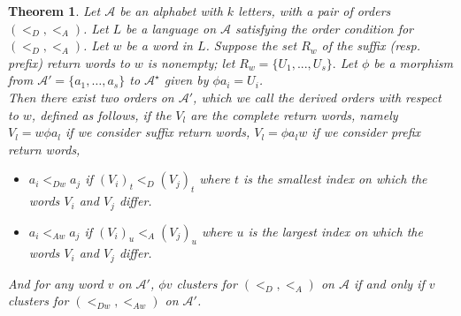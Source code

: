 \documentclass[12pt,a4paper]{amsart}
\newtheorem{theorem}{Theorem}
\begin{document}
\begin{theorem}\label{t2} Let  $\mathcal A$ be an alphabet with $k$ letters, with a pair of orders $(<_D,<_A)$. Let $L$ be a language on $\mathcal A$ satisfying the order condition for  $(<_D,<_A)$. Let $w$ be a word in $L$. Suppose the set $R_w$ of the suffix (resp. prefix) return words to  $w$  is nonempty; let
$R_w=\{U_1, ... , U_s\}.$ Let $\phi$ be  a morphism from $\mathcal A'=\{a_1, \ldots, a_s\}$ 
to $\mathcal A^{\star}$ given  by $\phi a_i=U_i$. \\
Then there exist two orders on  $\mathcal A'$, which we call the {\em derived orders with respect to $w$}, defined as follows, if the $V_l$ are the complete return words, namely $V_l=w\phi a_l$ if we consider suffix return words,  $V_l=\phi a_lw$ if we consider prefix return words, 
\begin{itemize}
\item $a_i<_{Dw} a_j$ if $(V_i)_t<_D(V_j)_t$ where $t$ is the smallest index on which the words  $V_i$ and $V_j$ differ.
\item $a_i<_ {Aw}a_j$ if $(V_i)_u<_A(V_j)_u$  where $u$ is the largest index on which the words $V_i$ and $V_j$ differ.
\end{itemize}
And for any word $v$ on $\mathcal A'$,  $\phi v$ clusters for $(<_D,<_A)$ on $\mathcal A$  if and only if $v$ clusters for $(<_ {Dw},<_ {Aw})$ on $\mathcal A'$.
\end{theorem}
\end{document}
